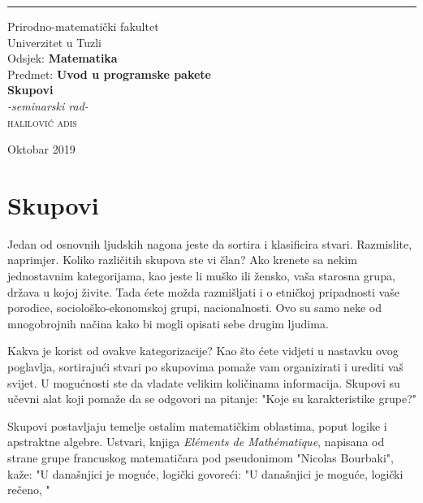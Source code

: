 \documentclass[a4paper, 14pt]{article}
\theoremstyle{definition}
\begin{document}
\begin{titlepage}
\raggedright
\rule{1pt}{\textheight}
\hspace{0.05\textwidth}
\parbox[b]{0.75\textwidth}{

{\large{Prirodno-matematički fakultet\\
Univerzitet u Tuzli\\
Odsjek: \textbf{Matematika}\\
Predmet: \textbf{Uvod u programske pakete}}}\\[7\baselineskip]
{\Huge\bfseries Skupovi}\\[1\baselineskip]
{\large\textit{-seminarski rad-}}\\[5\baselineskip]
{\Large\textsc{halilović adis}}

\vspace{0.5\textheight}

{\noindent Oktobar 2019}\\[\baselineskip]
}
\end{titlepage}

\tableofcontents
\thispagestyle{empty}
\newpage

\section{Skupovi}

\begin{Large}
Jedan od osnovnih ljudskih nagona jeste da sortira i klasificira stvari. Razmislite, naprimjer. Koliko različitih skupova ste vi član? Ako krenete sa nekim jednostavnim kategorijama, kao jeste li muško ili žensko, vaša starosna grupa, država u kojoj živite. Tada ćete možda razmišljati i o etničkoj pripadnosti vaše porodice, sociološko-ekonomskoj grupi, nacionalnosti. Ovo su samo neke od mnogobrojnih načina kako bi mogli opisati sebe drugim ljudima.

Kakva je korist od ovakve kategorizacije? Kao što ćete vidjeti u nastavku ovog poglavlja, sortirajući stvari po skupovima pomaže vam organizirati i urediti vaš svijet. U mogućnosti ste da vladate velikim količinama informacija. Skupovi su učevni alat koji pomaže da se odgovori na pitanje: "Koje su karakteristike grupe?"

Skupovi postavljaju temelje ostalim matematičkim oblastima, poput logike i apstraktne algebre. Ustvari, knjiga \textit{El\' ements de Math\' ematique}, napisana od strane grupe francuskog matematičara pod pseudonimom "Nicolas Bourbaki", kaže: "U današnjici je moguće, logički govoreći: "U današnjici je moguće, logički rečeno, "

\vfill
\noindent{}
\end{Large}
\end{document}
